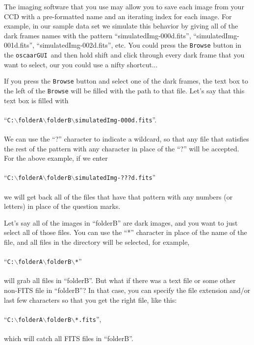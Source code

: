 \documentclass[a4paper]{article}
\newcommand{\code}[1]{\texttt{#1}}
\newcommand{\gui}{\code{oscaarGUI}~}
\begin{document}
The imaging software that you use may allow you to save each image from your CCD with a pre-formatted name and an iterating index for each image. For example, in our sample data set we simulate this behavior by giving all of the dark frames names with the pattern ``simulatedImg-000d.fits'', ``simulatedImg-001d.fits'', ``simulatedImg-002d.fits'', etc. You could press the \code{Browse} button in the \gui and then hold shift and click through every dark frame that you want to select, our you could use a nifty shortcut...

If you press the \code{Browse} button and select one of the dark frames, the text box to the left of the \code{Browse} will be filled with the path to that file. Let's say that this text box is filled with 
\\\\
\noindent``\code{C:$\backslash$folderA$\backslash$folderB$\backslash$simulatedImg-000d.fits}''. 
\\\\
\noindent We can use the ``?'' character to indicate a wildcard, so that any file that satisfies the rest of the pattern with any character in place of the ``?'' will be accepted. For the above example, if we enter 
\\\\
\noindent ``\code{C:$\backslash$folderA$\backslash$folderB$\backslash$simulatedImg-???d.fits}'' 
\\\\
\noindent we will get back all of the files that have that pattern with any numbers (or letters) in place of the question marks. 

Let's say all of the images in ``folderB'' are dark images, and you want to just select all of those files. You can use the ``*'' character in place of the name of the file, and all files in the directory will be selected, for example, 
\\\\
\noindent ``\code{C:$\backslash$folderA$\backslash$folderB$\backslash$*}'' 
\\\\
\noindent will grab all files in ``folderB''. But what if there was a text file or some other non-FITS file in ``folderB''? In that case, you can specify the file extension and/or last few characters so that you get the right file, like this: 
\\\\
\noindent ``\code{C:$\backslash$folderA$\backslash$folderB$\backslash$*.fits}'', 
\\\\
\noindent which will catch all FITS files in ``folderB''.
\end{document}
